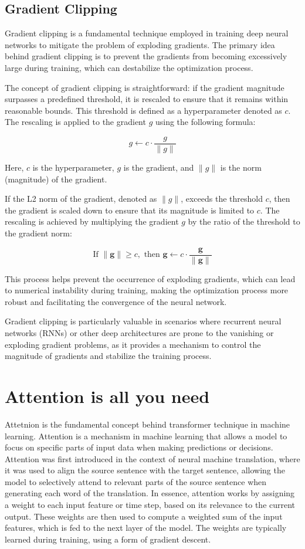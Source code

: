 \documentclass{report}
\begin{document}
\subsection{Gradient Clipping}
Gradient clipping is a fundamental technique employed in training deep neural networks to mitigate the problem of exploding gradients. The primary idea behind gradient clipping is to prevent the gradients from becoming excessively large during training, which can destabilize the optimization process.

The concept of gradient clipping is straightforward: if the gradient magnitude surpasses a predefined threshold, it is rescaled to ensure that it remains within reasonable bounds. This threshold is defined as a hyperparameter denoted as \(c\). The rescaling is applied to the gradient \(g\) using the following formula:

\[
g \leftarrow c \cdot \frac{g}{\|g\|}
\]

Here, \(c\) is the hyperparameter, \(g\) is the gradient, and \(\|g\|\) is the norm (magnitude) of the gradient.

If the L2 norm of the gradient, denoted as \(\|g\|\), exceeds the threshold \(c\), then the gradient is scaled down to ensure that its magnitude is limited to \(c\). The rescaling is achieved by multiplying the gradient \(g\) by the ratio of the threshold to the gradient norm:

\[
\text{If } \|\mathbf{g}\| \geq c, \text{ then } \mathbf{g} \leftarrow c \cdot \frac{\mathbf{g}}{\|\mathbf{g}\|}
\]

This process helps prevent the occurrence of exploding gradients, which can lead to numerical instability during training, making the optimization process more robust and facilitating the convergence of the neural network.

Gradient clipping is particularly valuable in scenarios where recurrent neural networks (RNNs) or other deep architectures are prone to the vanishing or exploding gradient problems, as it provides a mechanism to control the magnitude of gradients and stabilize the training process.

\section{Attention is all you need}
Attetnion is the fundamental concept behind transformer technique in machine learning. Attention is a mechanism in machine learning that allows a model to focus on specific parts of input data when making predictions or decisions. Attention was first introduced in the context of neural machine translation, where it was used to align the source sentence with the target sentence, allowing the model to selectively attend to relevant parts of the source sentence when generating each word of the translation. In essence, attention works by assigning a weight to each input feature or time step, based on its relevance to the current output. These weights are then used to compute a weighted sum of the input features, which is fed to the next layer of the model. The weights are typically learned during training, using a form of gradient descent.
\end{document}
